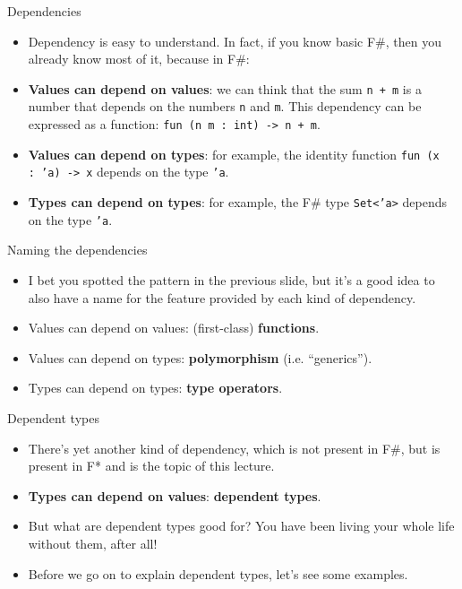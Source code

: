 \documentclass{beamer}
\newcommand{\m}[1]{\texttt{#1}}
\begin{document}
\begin{frame}{Dependencies}
\begin{itemize}
	\item Dependency is easy to understand. In fact, if you know basic F\#, then you already know most of it, because in F\#:
	\item \textbf{Values can depend on values}: we can think that the sum \m{n + m} is a number that depends on the numbers \m{n} and \m{m}. This dependency can be expressed as a function: \m{fun (n m :\ int) -> n + m}.
	\item \textbf{Values can depend on types}: for example, the identity function \m{fun (x :\ 'a) -> x} depends on the type \m{'a}.
	\item \textbf{Types can depend on types}: for example, the F\# type \m{Set<'a>} depends on the type \m{'a}.
\end{itemize}
\end{frame}

\begin{frame}{Naming the dependencies}
\begin{itemize}
	\item I bet you spotted the pattern in the previous slide, but it's a good idea to also have a name for the feature provided by each kind of dependency.
	\item Values can depend on values: (first-class) \textbf{functions}.
	\item Values can depend on types: \textbf{polymorphism} (i.e. ``generics'').
	\item Types can depend on types: \textbf{type operators}.
\end{itemize}
\end{frame}

\begin{frame}{Dependent types}
\begin{itemize}
	\item There's yet another kind of dependency, which is not present in F\#, but is present in F* and is the topic of this lecture.
	\item \textbf{Types can depend on values}: \textbf{dependent types}.
	\item But what are dependent types good for? You have been living your whole life without them, after all!
	\item Before we go on to explain dependent types, let's see some examples.
\end{itemize}
\end{frame}
\end{document}
